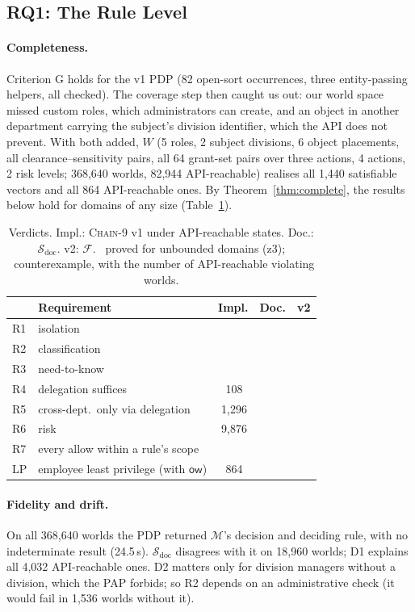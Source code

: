 \documentclass[sigconf,review,anonymous]{acmart}
\newcommand{\chain}{\textsc{Chain-9}\xspace}
\newcommand{\ow}{\mathsf{ow}}
\newcommand{\ok}{\ding{51}}
\newcommand{\no}{\ding{55}}
\begin{document}
\subsection{RQ1: The Rule Level}
\label{sec:l1}

\paragraph{Completeness.} Criterion G holds for the v1 PDP (82 open-sort occurrences, three entity-passing helpers,
all checked). The coverage step then caught us out: our world space missed custom roles, which administrators can
create, and an object in another department carrying the subject's division identifier, which the API does not
prevent. With both added, $W$ (5 roles, 2 subject divisions, 6 object placements, all clearance--sensitivity pairs,
all 64 grant-set pairs over three actions, 4 actions, 2 risk levels; 368{,}640 worlds, 82{,}944 API-reachable)
realises all 1{,}440 satisfiable vectors and all 864 API-reachable ones. By Theorem~\ref{thm:complete}, the results
below hold for domains of any size (Table~\ref{tab:verdict}).

\begin{table}[t]
\caption{Verdicts. Impl.: \chain v1 under API-reachable states. Doc.: $\mathcal{S}_{\mathrm{doc}}$. v2: $\mathcal{F}$.
\ok\ proved for unbounded domains (z3); \no\ counterexample, with the number of API-reachable violating worlds.}
\label{tab:verdict}
\small
\begin{tabular}{@{}l@{\;}l@{\;}c@{\;}c@{\;}c@{}}
\toprule
 & Requirement & Impl. & Doc. & v2 \\
\midrule
R1 & isolation & \ok & \ok & \ok \\
R2 & classification & \ok & \ok & \ok \\
R3 & need-to-know & \ok & \no & \ok \\
R4 & delegation suffices & \no\,108 & \no & \ok \\
R5 & cross-dept.\ only via delegation & \no\,1{,}296 & \ok & \ok \\
R6 & risk & \no\,9{,}876 & \no & \ok \\
R7 & every allow within a rule's scope & \ok & \no & \ok \\
LP & employee least privilege (with $\ow$) & \no\,864 & \ok & \ok \\
\bottomrule
\end{tabular}
\end{table}

\paragraph{Fidelity and drift.} On all 368{,}640 worlds the PDP returned $\mathcal{M}$'s decision and deciding rule,
with no indeterminate result (24.5\,s). $\mathcal{S}_{\mathrm{doc}}$ disagrees with it on 18{,}960 worlds; D1 explains
all 4{,}032 API-reachable ones. D2 matters only for division managers without a division, which the PAP forbids; so
R2 depends on an administrative check (it would fail in 1{,}536 worlds without it).
\end{document}
